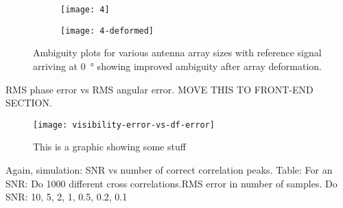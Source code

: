 \begin{figure}
  \centering
  \begin{subfigure}{\textwidth}
    \centering
    \texttt{[image: 4]}
  \end{subfigure}
  \begin{subfigure}{\textwidth}
    \centering
    \texttt{[image: 4-deformed]}
  \end{subfigure}
  \caption{Ambiguity plots for various antenna array sizes with reference signal arriving at \SI{0}{\degree} showing improved ambiguity after array deformation.}
\end{figure}

RMS phase error vs RMS angular error. MOVE THIS TO FRONT-END SECTION.
\begin{figure}
  \centering
  \texttt{[image: visibility-error-vs-df-error]}
  \caption{This is a graphic showing some stuff}
\end{figure}

Again, simulation:
SNR vs number of correct correlation peaks.
Table: 
For an SNR: Do 1000 different cross correlations.RMS error in number of samples.
Do SNR: 10, 5, 2, 1, 0.5, 0.2, 0.1
